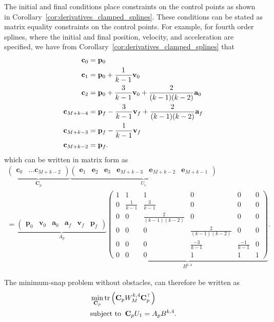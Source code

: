 The initial and final conditions place constraints on the control points as shown in Corollary~\ref{cor:derivatives_clamped_splines}.  These conditions can be stated as matrix equality constraints on the control points.  For example, for fourth order splines, where the initial and final position, velocity, and acceleration are specified, we have from Corollary~\ref{cor:derivatives_clamped_splines} that
\begin{align*}
			\mathbf{c}_0 &= \mathbf{p}_0 \\
			\mathbf{c}_1 &= \mathbf{p}_0 + \frac{1}{k-1} \mathbf{v}_0 \\
			\mathbf{c}_2 &= \mathbf{p}_0 + \frac{3}{k-1} \mathbf{v}_0 + \frac{2}{(k-1)(k-2)}\mathbf{a}_0 \\
			\mathbf{c}_{M+k-4} &= \mathbf{p}_f - \frac{3}{k-1}\mathbf{v}_f + \frac{2}{(k-1)(k-2)}\mathbf{a}_f \\
			\mathbf{c}_{M+k-3} &= \mathbf{p}_f - \frac{1}{k-1}\mathbf{v}_f \\
			\mathbf{c}_{M+k-2} &= \mathbf{p}_f.
\end{align*}
which can be written in matrix form as
\begin{multline*}
	\underbrace{\begin{pmatrix}\mathbf{c}_0 & \dots \mathbf{c}_{M+k-2} \end{pmatrix}}_{\mathbf{C}_p}
	\underbrace{\begin{pmatrix} \mathbf{e}_1 & \mathbf{e}_2 & \mathbf{e}_3 & \mathbf{e}_{M+k-3} & \mathbf{e}_{M+k-2} & \mathbf{e}_{M+k-1} \end{pmatrix}}_{U_1}
	\\ = 
	\underbrace{\begin{pmatrix}\mathbf{p}_0 & \mathbf{v}_0 & \mathbf{a}_0 & \mathbf{a}_f & \mathbf{v}_f & \mathbf{p}_f \end{pmatrix}}_{A_p}
	\underbrace{\begin{pmatrix} 1 & 1 & 1 & 0 & 0 & 0 \\ 0 & \frac{1}{k-1} & \frac{3}{k-1} & 0 & 0 & 0 \\ 0 & 0 & \frac{2}{(k-1)(k-2)} & 0 & 0 & 0 \\ 0 & 0 & 0 & \frac{2}{(k-1)(k-2)} & 0 & 0 \\ 0 & 0 & 0 & \frac{-3}{k-1} & \frac{-1}{k-1} & 0 \\ 0 & 0 & 0 & 1 & 1 & 1 \end{pmatrix}}_{B^{k,4}}.
\end{multline*}


The minimum-snap problem without obstacles, can therefore be written as
\begin{equation}
	\label{eq:min_snap_no_obstacles}
	\begin{aligned}
	&\min_{\mathbf{C}_p} \trace{\mathbf{C}_p W_M^{k,4} \mathbf{C}_p^\top} \\
	&\text{subject to } \: \mathbf{C}_p U_1 = A_p B^{k,4}. 
	\end{aligned}
\end{equation}

